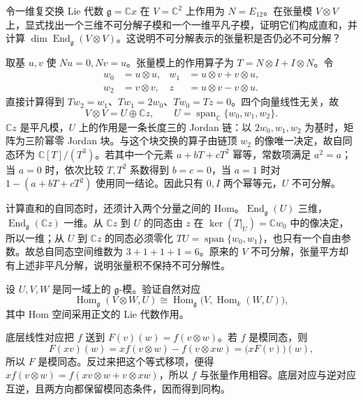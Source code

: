 \begin{exercise}\label{b5:ex:11-jordan-endomorphisms}
	令一维复交换 Lie 代数 \(\mathfrak g=\mathbb Cx\) 在 \(V=\mathbb C^2\) 上作用为 \(N=E_{12}\)。在张量模 \(V\otimes V\) 上，显式找出一个三维不可分解子模和一个一维平凡子模，证明它们构成直和，并计算 \(\dim\operatorname{End}_{\mathfrak g}(V\otimes V)\)。这说明不可分解表示的张量积是否仍必不可分解？
\end{exercise}
\begin{solution}
	取基 \(u,v\) 使 \(Nu=0,Nv=u\)。张量模上的作用算子为 \(T=N\otimes I+I\otimes N\)。令
	\[
		\begin{aligned}
			w_0&=u\otimes u,& w_1&=u\otimes v+v\otimes u,\\
			w_2&=v\otimes v,& z&=u\otimes v-v\otimes u.
		\end{aligned}
	\]
	直接计算得到 \(Tw_2=w_1\)、\(Tw_1=2w_0\)、\(Tw_0=Tz=0\)。四个向量线性无关，故
	\[
		V\otimes V=U\oplus\mathbb Cz,\qquad U=\operatorname{span}_{\mathbb C}\{w_0,w_1,w_2\}.
	\]
	\(\mathbb Cz\) 是平凡模，\(U\) 上的作用是一条长度三的 Jordan 链：以 \(2w_0,w_1,w_2\) 为基时，矩阵为三阶幂零 Jordan 块。与这个块交换的算子由链顶 \(w_2\) 的像唯一决定，故自同态环为 \(\mathbb C[T]/(T^3)\)。若其中一个元素 \(a+bT+cT^2\) 幂等，常数项满足 \(a^2=a\)；当 \(a=0\) 时，依次比较 \(T,T^2\) 系数得到 \(b=c=0\)，当 \(a=1\) 时对 \(1-(a+bT+cT^2)\) 使用同一结论。因此只有 \(0,I\) 两个幂等元，\(U\) 不可分解。

	计算直和的自同态时，还须计入两个分量之间的 Hom。\(\operatorname{End}_{\mathfrak g}(U)\) 三维，\(\operatorname{End}_{\mathfrak g}(\mathbb Cz)\) 一维。从 \(\mathbb Cz\) 到 \(U\) 的同态由 \(z\) 在 \(\ker(T|_U)=\mathbb Cw_0\) 中的像决定，所以一维；从 \(U\) 到 \(\mathbb Cz\) 的同态必须零化 \(TU=\operatorname{span}\{w_0,w_1\}\)，也只有一个自由参数。故总自同态空间维数为 \(3+1+1+1=6\)。原来的 \(V\) 不可分解，张量平方却有上述非平凡分解，说明张量积不保持不可分解性。
\end{solution}

\begin{exercise}\label{b5:ex:11-tensor-hom-adjunction}
	设 \(U,V,W\) 是同一域上的 \(\mathfrak g\)-模。验证自然对应
	\[
		\operatorname{Hom}_{\mathfrak g}(V\otimes W,U) \cong \operatorname{Hom}_{\mathfrak g} \bigl(V,\operatorname{Hom}_k(W,U)\bigr),
	\]
	其中 Hom 空间采用正文的 Lie 代数作用。
\end{exercise}
\begin{solution}
	底层线性对应把 \(f\) 送到 \(F(v)(w)=f(v\otimes w)\)。若 \(f\) 是模同态，则
	\[
		F(xv)(w) =x f(v\otimes w)-f(v\otimes xw) =\bigl(xF(v)\bigr)(w),
	\]
	所以 \(F\) 是模同态。反过来把这个等式移项，便得 \(x f(v\otimes w)=f(xv\otimes w+v\otimes xw)\)，所以 \(f\) 与张量作用相容。底层对应与逆对应互逆，且两方向都保留模同态条件，因而得到同构。
\end{solution}

